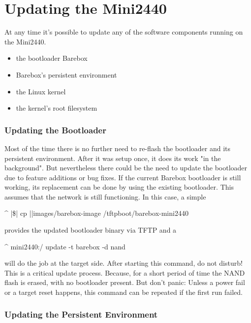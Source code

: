 \section{Updating the Mini2440}	\label{sec:updating}

At any time it's possible to update any of the software components
running on the Mini2440.

\begin{itemize}
	\item the bootloader Barebox
	\item Barebox's persistent environment
	\item the Linux kernel
	\item the kernel's root filesystem
\end{itemize}

\subsubsection{Updating the Bootloader}

Most of the time there is no further need to re-flash the bootloader and its
persistent environment. After it was setup once, it does its work "in the
background". But nevertheless there could be the need to update the bootloader
due to feature additions or bug fixes. If the current Barebox bootloader is
still working, its replacement can be done by using the existing bootloader.
This assumes that the network is still functioning. In this case, a simple

\begin{ptxshell}[escapechar=|]{^}
|\$| cp |\ptxdistPlatformDir |images/barebox-image /tftpboot/barebox-mini2440
\end{ptxshell}

provides the updated bootloader binary via TFTP and a

\begin{ptxshell}[escapechar=|]{^}
mini2440:/ update -t barebox -d nand
\end{ptxshell}

will do the job at the target side. After starting this command, do not disturb!
This is a critical update process. Because, for a short period of time the
NAND flash is erased, with no bootloader present. But don't panic: Unless a
power fail or a target reset happens, this command can be repeated if the
first run failed.

\subsubsection{Updating the Persistent Environment}

